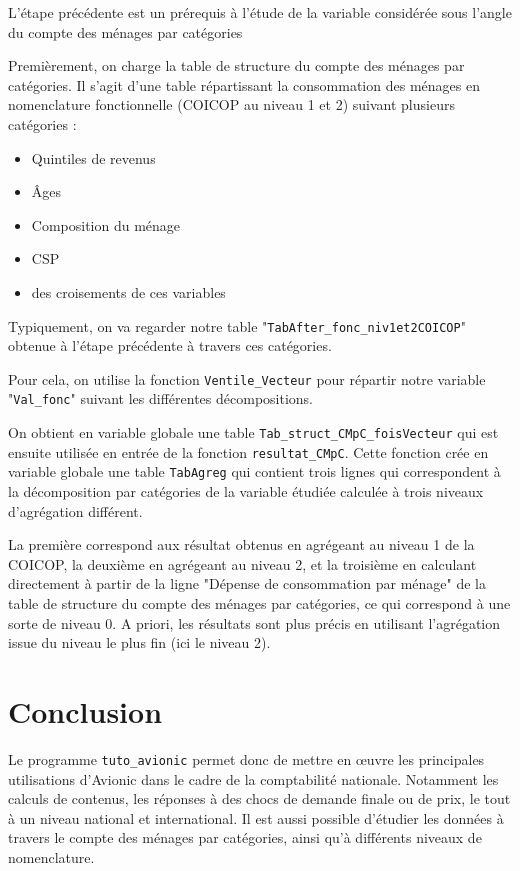 \documentclass[a4paper,french,11pt]{article}
\begin{document}
L'\'etape pr\'ec\'edente est un pr\'erequis \`a l'\'etude de la variable consid\'er\'ee sous l'angle du compte des m\'enages par cat\'egories

Premi\`erement, on charge la table de structure du compte des m\'enages par cat\'egories. Il s'agit d'une table r\'epartissant la consommation des m\'enages en nomenclature fonctionnelle (COICOP au niveau 1 et 2) suivant plusieurs cat\'egories :
\begin{itemize}
\item Quintiles de revenus
\item \^Ages
\item Composition du m\'enage
\item CSP
\item des croisements de ces variables
\end{itemize}

Typiquement, on va regarder notre table "\verb|TabAfter_fonc_niv1et2COICOP|" obtenue \`a l'\'etape pr\'ec\'edente \`a travers ces cat\'egories.

Pour cela, on utilise la fonction \verb|Ventile_Vecteur| pour r\'epartir notre variable "\verb|Val_fonc|" suivant les diff\'erentes d\'ecompositions. 

On obtient en variable globale une table \verb|Tab_struct_CMpC_foisVecteur| qui est ensuite utilis\'ee en entr\'ee de la fonction \verb|resultat_CMpC|. Cette fonction cr\'ee en variable globale une table \verb|TabAgreg| qui contient trois lignes qui correspondent \`a la d\'ecomposition par cat\'egories de la variable \'etudi\'ee calcul\'ee \`a trois niveaux d'agr\'egation diff\'erent. 

La premi\`ere correspond aux r\'esultat obtenus en agr\'egeant au niveau 1 de la COICOP, la deuxi\`eme en agr\'egeant au niveau 2, et la troisi\`eme en calculant directement \`a partir de la ligne "D\'epense de consommation par m\'enage" de la table de structure du compte des m\'enages par cat\'egories, ce qui correspond \`a une sorte de niveau 0. A priori, les r\'esultats sont plus pr\'ecis en utilisant l'agr\'egation issue du niveau le plus fin (ici le niveau 2).

\section{Conclusion}

Le programme \verb|tuto_avionic| permet donc de mettre en \oe{}uvre les principales utilisations d'Avionic dans le cadre de la comptabilit\'e nationale. Notamment les calculs de contenus, les r\'eponses \`a des chocs de demande finale ou de prix, le tout \`a un niveau national et international. Il est aussi possible d'\'etudier les donn\'ees \`a travers le compte des m\'enages par cat\'egories, ainsi qu'\`a diff\'erents niveaux de nomenclature.
\end{document}
